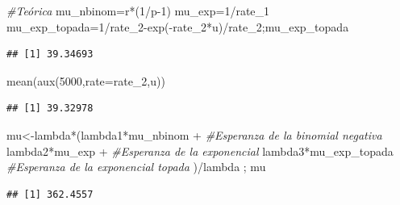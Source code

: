 \documentclass[
]{article}
\newenvironment{Shaded}{\begin{snugshade}}{\end{snugshade}}
\newcommand{\AttributeTok}[1]{\textcolor[rgb]{0.77,0.63,0.00}{#1}}
\newcommand{\CommentTok}[1]{\textcolor[rgb]{0.56,0.35,0.01}{\textit{#1}}}
\newcommand{\DecValTok}[1]{\textcolor[rgb]{0.00,0.00,0.81}{#1}}
\newcommand{\FunctionTok}[1]{\textcolor[rgb]{0.00,0.00,0.00}{#1}}
\newcommand{\NormalTok}[1]{#1}
\newcommand{\OtherTok}[1]{\textcolor[rgb]{0.56,0.35,0.01}{#1}}
\newcommand{\SpecialCharTok}[1]{\textcolor[rgb]{0.00,0.00,0.00}{#1}}
\begin{document}
\begin{Shaded}
\begin{Highlighting}[]
\CommentTok{\#Teórica}
\NormalTok{mu\_nbinom}\OtherTok{=}\NormalTok{r}\SpecialCharTok{*}\NormalTok{(}\DecValTok{1}\SpecialCharTok{/}\NormalTok{p}\DecValTok{{-}1}\NormalTok{)}
\NormalTok{mu\_exp}\OtherTok{=}\DecValTok{1}\SpecialCharTok{/}\NormalTok{rate\_1}
\NormalTok{mu\_exp\_topada}\OtherTok{=}\DecValTok{1}\SpecialCharTok{/}\NormalTok{rate\_2}\SpecialCharTok{{-}}\FunctionTok{exp}\NormalTok{(}\SpecialCharTok{{-}}\NormalTok{rate\_2}\SpecialCharTok{*}\NormalTok{u)}\SpecialCharTok{/}\NormalTok{rate\_2;mu\_exp\_topada}
\end{Highlighting}
\end{Shaded}

\begin{verbatim}
## [1] 39.34693
\end{verbatim}

\begin{Shaded}
\begin{Highlighting}[]
\FunctionTok{mean}\NormalTok{(}\FunctionTok{aux}\NormalTok{(}\DecValTok{5000}\NormalTok{,}\AttributeTok{rate=}\NormalTok{rate\_2,u))}
\end{Highlighting}
\end{Shaded}

\begin{verbatim}
## [1] 39.32978
\end{verbatim}

\begin{Shaded}
\begin{Highlighting}[]
\NormalTok{mu}\OtherTok{\textless{}{-}}\NormalTok{lambda}\SpecialCharTok{*}\NormalTok{(lambda1}\SpecialCharTok{*}\NormalTok{mu\_nbinom }\SpecialCharTok{+}  \CommentTok{\#Esperanza de la binomial negativa}
\NormalTok{        lambda2}\SpecialCharTok{*}\NormalTok{mu\_exp }\SpecialCharTok{+} \CommentTok{\#Esperanza de la exponencial}
\NormalTok{        lambda3}\SpecialCharTok{*}\NormalTok{mu\_exp\_topada }\CommentTok{\#Esperanza de la exponencial topada}
\NormalTok{        )}\SpecialCharTok{/}\NormalTok{lambda ; mu}
\end{Highlighting}
\end{Shaded}

\begin{verbatim}
## [1] 362.4557
\end{verbatim}
\end{document}
